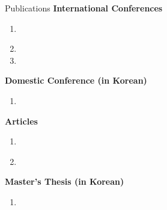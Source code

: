 \begin{rSection}{Publications}
  \textbf{International Conferences}
  \nopagebreak[4]
  \begin{enumerate}
    \item \begin{samepage}\par\end{samepage}
    \item {}
    \item {}
  \end{enumerate}

  \begin{samepage}
    \textbf{Domestic Conference (in Korean)}
    \begin{enumerate}
      \item {}
    \end{enumerate}
  \end{samepage}

  \textbf{Articles}
  \nopagebreak[4]
  \begin{enumerate}
    \item \begin{samepage}\par\end{samepage}
    \item {}
  \end{enumerate}

  \begin{samepage}
    \textbf{Master's Thesis (in Korean)}
    \begin{enumerate}
      \item {}
    \end{enumerate}
  \end{samepage}
\end{rSection}
